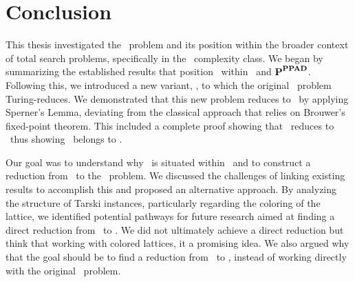 \chapter{Conclusion}\label{ch:conclusion}

This thesis investigated the \Tarski\ problem and its position within the broader context of total search problems, specifically in the \TFNP\ complexity class. We began by summarizing the established results that position \Tarski\ within \PLS\ and ${\textbf{P}}^{\textbf{PPAD}}$. Following this, we introduced a new variant, \Tarskistar, to which the original \Tarski\ problem Turing-reduces. We demonstrated that this new problem reduces to \EndOfLine\ by applying Sperner's Lemma, deviating from the classical approach that relies on Brouwer's fixed-point theorem. This included a complete proof showing that \Sperner\ reduces to \EndOfLine\ thus showing \Tarski\ belongs to \PPAD\@.

Our goal was to understand why \Tarski\ is situated within \EOPL\ and to construct a reduction from \Tarski\ to the \EndOfPotentialLine\ problem. We discussed the challenges of linking existing results to accomplish this and proposed an alternative approach. By analyzing the structure of Tarski instances, particularly regarding the coloring of the lattice, we identified potential pathways for future research aimed at finding a direct reduction from \Tarski\ to \EndOfPotentialLine. We did not ultimately achieve a direct reduction but think that working with colored lattices, it a promising idea. We also argued why that the goal should be to find a reduction from \Tarskistar\ to \EndOfPotentialLine\@, instead of working directly with the original \Tarski\ problem.